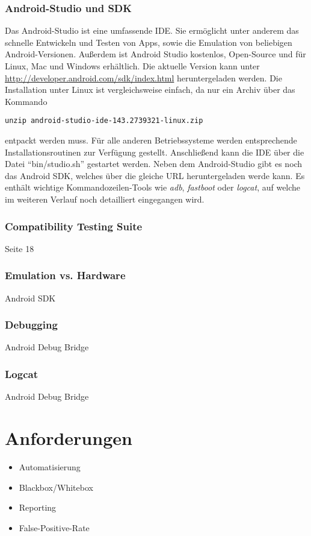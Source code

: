 			\subsubsection{Android-Studio und SDK}
			Das Android-Studio ist eine umfassende IDE. Sie ermöglicht unter anderem das schnelle Entwickeln und Testen von Apps, sowie die Emulation von beliebigen Android-Versionen. Außerdem ist Android Studio kostenlos, Open-Source und für Linux, Mac und Windows erhältlich. Die aktuelle Version kann unter \url{http://developer.android.com/sdk/index.html} heruntergeladen werden. Die Installation unter Linux ist vergleichsweise einfach, da nur ein Archiv über das Kommando 
\begin{lstlisting}
unzip android-studio-ide-143.2739321-linux.zip
\end{lstlisting}
entpackt werden muss. Für alle anderen Betriebssysteme werden entsprechende Installationsroutinen zur Verfügung gestellt. Anschließend kann die IDE über die Datei "`bin/studio.sh"' gestartet werden. Neben dem Android-Studio gibt es noch das Android SDK, welches über die gleiche URL heruntergeladen werde kann. Es enthält wichtige Kommandozeilen-Tools wie \textit{adb}, \textit{fastboot} oder \textit{logcat}, auf welche im weiteren Verlauf noch detailliert eingegangen wird.
			\subsubsection{Compatibility Testing Suite}
			\cite{Drake2014} Seite 18
			\subsubsection{Emulation vs. Hardware}
			Android SDK
			\subsubsection{Debugging}	
			Android Debug Bridge\cite{androidDebugBridge}
			\subsubsection{Logcat}	
			Android Debug Bridge\cite{androidDebugBridge}
	\section{Anforderungen}
	\begin{itemize}
		\item Automatisierung
		\item Blackbox/Whitebox
		\item Reporting
		\item False-Positive-Rate
	\end{itemize}
